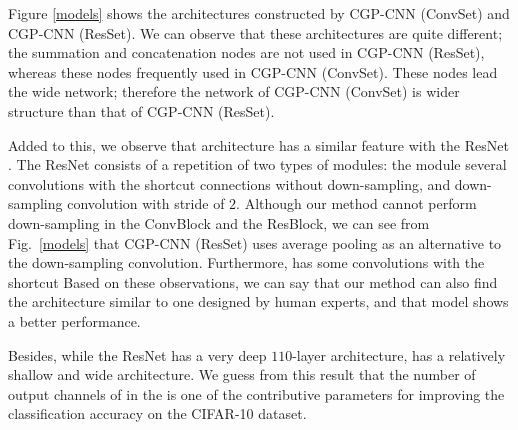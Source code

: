 Figure \ref{models} shows the architectures constructed by CGP-CNN (ConvSet) and CGP-CNN (ResSet). We can observe that these architectures are quite different; the summation and concatenation nodes are not used in CGP-CNN (ResSet), whereas these nodes  frequently used in CGP-CNN (ConvSet). These nodes lead the wide network; therefore\new{,} the network of CGP-CNN (ConvSet) is  wider structure than that of CGP-CNN (ResSet).

Added to this, we observe that  architecture has a similar feature with the ResNet \cite{he_deep_2016}. The ResNet consists of a repetition of two types of modules: the module  several convolutions with the shortcut connections without down-sampling, and down-sampling convolution with  stride of $2$.  Although our method cannot perform down-sampling in the ConvBlock and the ResBlock, we can see from Fig.~\ref{models} that CGP-CNN (ResSet) uses average pooling as an alternative to the down-sampling convolution. Furthermore,  has some convolutions with the shortcut    Based on these observations, we can say that our method can also find the architecture similar to one designed by human experts, and that model shows a better performance.

Besides, while the ResNet has a very deep $110$-layer architecture,  has a relatively shallow and wide architecture.
We guess from this result that the number of output channels of  in the  is one of the contributive parameters for improving the classification accuracy on the CIFAR-10 dataset.


